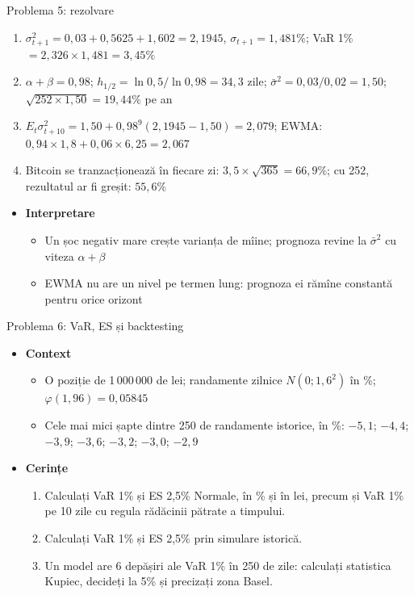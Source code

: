 \begin{frame}{Problema 5: rezolvare}
\itemsize{\footnotesize}
\begin{enumerate}
    \item $\sigma_{t+1}^2 = 0{,}03 + 0{,}5625 + 1{,}602 = 2{,}1945$, $\sigma_{t+1} = 1{,}481\%$; VaR 1\% $= 2{,}326 \times 1{,}481 = 3{,}45\%$
    \item $\alpha + \beta = 0{,}98$; $h_{1/2} = \ln 0{,}5/\ln 0{,}98 = 34{,}3$ zile; $\bar\sigma^2 = 0{,}03/0{,}02 = 1{,}50$; $\sqrt{252 \times 1{,}50} = 19{,}44\%$ pe an
    \item $E_t\sigma_{t+10}^2 = 1{,}50 + 0{,}98^9(2{,}1945 - 1{,}50) = 2{,}079$; EWMA: $0{,}94 \times 1{,}8 + 0{,}06 \times 6{,}25 = 2{,}067$
    \item Bitcoin se tranzacționează în fiecare zi: $3{,}5 \times \sqrt{365} = 66{,}9\%$; cu 252, rezultatul ar fi greșit: $55{,}6\%$
\end{enumerate}
\begin{itemize}
    \item \textbf{Interpretare}
    \begin{itemize}
        \item Un șoc negativ mare crește varianța de mîine; prognoza revine la $\bar\sigma^2$ cu viteza $\alpha + \beta$
        \item EWMA nu are un nivel pe termen lung: prognoza ei rămîne constantă pentru orice orizont
    \end{itemize}
\end{itemize}
\end{frame}

\begin{frame}{Problema 6: VaR, ES și backtesting}
\itemsize{\footnotesize}
\begin{itemize}
    \item \textbf{Context}
    \begin{itemize}
        \item O poziție de 1\,000\,000 de lei; randamente zilnice $N(0; 1{,}6^2)$ în \%; $\varphi(1{,}96) = 0{,}05845$
        \item Cele mai mici șapte dintre 250 de randamente istorice, în \%: $-5{,}1$; $-4{,}4$; $-3{,}9$; $-3{,}6$; $-3{,}2$; $-3{,}0$; $-2{,}9$
    \end{itemize}
    \item \textbf{Cerințe}
\begin{enumerate}
    \item Calculați VaR 1\% și ES 2,5\% Normale, în \% și în lei, precum și VaR 1\% pe 10 zile cu regula rădăcinii pătrate a timpului.
    \item Calculați VaR 1\% și ES 2,5\% prin simulare istorică.
    \item Un model are 6 depășiri ale VaR 1\% în 250 de zile: calculați statistica Kupiec, decideți la 5\% și precizați zona Basel.
\end{enumerate}
\end{itemize}
\end{frame}

